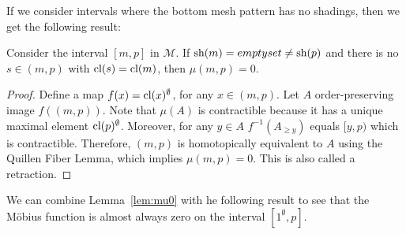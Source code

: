 \documentclass[11pt,a4paper,oneside]{article}
\begin{document}
If we consider intervals where the bottom mesh pattern has no shadings, then we get the following result:
\begin{lem}\label{lem:mu0}
Consider the interval $[m,p]$ in $\mathcal{M}$. If $\operatorname{\textrm{sh}}(m)=emptyset\not=\operatorname{\textrm{sh}}(p)$ and there is no $s\in(m,p)$ with $\operatorname{\textrm{cl}}(s)=\operatorname{\textrm{cl}}(m)$, then $\mu(m,p)=0$.
\begin{proof}
Define a map $f(x)=\operatorname{\textrm{cl}}(x)^\emptyset$, for any $x\in(m,p)$. Let $A$ order-preserving image $f((m,p))$. Note that $\mu(A)$ is contractible because it has a unique maximal element $\operatorname{\textrm{cl}}(p)^\emptyset$. Moreover, for any $y\in A$ $f^{-1}(A_{\ge y})$ equals $[y,p)$ which is contractible. Therefore, $(m,p)$ is homotopically equivalent to $A$ using the Quillen Fiber Lemma, which implies $\mu(m,p)=0$. This is also called a retraction.
\end{proof}
\end{lem}
We can combine Lemma~\ref{lem:mu0} with he following result to see that the M\"obius function is almost always zero on the interval $[1^\emptyset,p]$.
\end{document}
